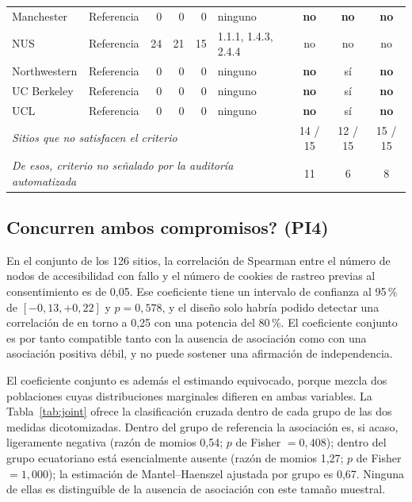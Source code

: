 \documentclass[pdflatex,sn-basic,Numbered,iicol]{sn-jnl}
\theoremstyle{thmstyleone}
\theoremstyle{thmstyletwo}
\theoremstyle{thmstylethree}
\begin{document}
\begin{table}[htbp]
\begin{tabular}{llrrrlccc}
		Manchester   & Referencia &  0 &  0 &  0 & ninguno                & \textbf{no} & \textbf{no} & \textbf{no} \\
		NUS          & Referencia & 24 & 21 & 15 & 1.1.1, 1.4.3, 2.4.4 & no          & no          & no          \\
		Northwestern & Referencia &  0 &  0 &  0 & ninguno                & \textbf{no} & s\'i         & \textbf{no} \\
		UC Berkeley  & Referencia &  0 &  0 &  0 & ninguno                & \textbf{no} & s\'i         & \textbf{no} \\
		UCL          & Referencia &  0 &  0 &  0 & ninguno                & \textbf{no} & s\'i         & \textbf{no} \\
		\midrule
		\multicolumn{6}{l}{\emph{Sitios que no satisfacen el criterio}} & 14 / 15 & 12 / 15 & 15 / 15 \\
		\multicolumn{6}{l}{\emph{De esos, criterio no se\~nalado por la auditor\'ia automatizada}} & 11 & 6 & 8 \\
		\bottomrule
	\end{tabular}
\end{table}

\subsection{\textquestiondown Concurren ambos compromisos? (PI4)}\label{sec:results-joint}

En el conjunto de los 126 sitios, la correlaci\'on de Spearman entre el n\'umero de nodos de accesibilidad con fallo y el n\'umero de cookies de rastreo previas al consentimiento es de 0,05. Ese coeficiente tiene un intervalo de confianza al 95\,\% de $[-0{,}13, +0{,}22]$ y $p=0{,}578$, y el dise\~no solo habr\'ia podido detectar una correlaci\'on de en torno a 0,25 con una potencia del 80\,\%. El coeficiente conjunto es por tanto compatible tanto con la ausencia de asociaci\'on como con una asociaci\'on positiva d\'ebil, y no puede sostener una afirmaci\'on de independencia.

El coeficiente conjunto es adem\'as el estimando equivocado, porque mezcla dos poblaciones cuyas distribuciones marginales difieren en ambas variables. La Tabla~\ref{tab:joint} ofrece la clasificaci\'on cruzada dentro de cada grupo de las dos medidas dicotomizadas. Dentro del grupo de referencia la asociaci\'on es, si acaso, ligeramente negativa (raz\'on de momios 0,54; $p$ de Fisher $=0{,}408$); dentro del grupo ecuatoriano est\'a esencialmente ausente (raz\'on de momios 1,27; $p$ de Fisher $=1{,}000$); la estimaci\'on de Mantel--Haenszel ajustada por grupo es 0,67. Ninguna de ellas es distinguible de la ausencia de asociaci\'on con este tama\~no muestral.
\end{document}
